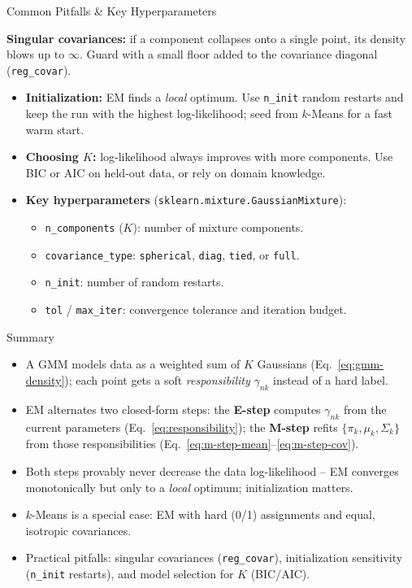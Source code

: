 \begin{frame}{Common Pitfalls \& Key Hyperparameters}
\begin{rlpitfall}
  \textbf{Singular covariances:} if a component collapses onto a single point, its density blows up to $\infty$.  Guard with a small floor added to the covariance diagonal (\texttt{reg\_covar}).
\end{rlpitfall}
\pause
\begin{itemize}
  \item \textbf{Initialization:} EM finds a \emph{local} optimum.  Use \texttt{n\_init} random restarts and keep the run with the highest log-likelihood; seed from $k$-Means for a fast warm start.
  \pause
  \item \textbf{Choosing $K$:} log-likelihood always improves with more components.  Use BIC or AIC on held-out data, or rely on domain knowledge.
  \pause
  \item \textbf{Key hyperparameters} (\texttt{sklearn.mixture.GaussianMixture}):
  \begin{itemize}
    \item \texttt{n\_components} ($K$): number of mixture components.
    \item \texttt{covariance\_type}: \texttt{spherical}, \texttt{diag}, \texttt{tied}, or \texttt{full}.
    \item \texttt{n\_init}: number of random restarts.
    \item \texttt{tol} / \texttt{max\_iter}: convergence tolerance and iteration budget.
  \end{itemize}
\end{itemize}
\end{frame}

\begin{frame}{Summary}
\begin{itemize}
  \item A GMM models data as a weighted sum of $K$ Gaussians (Eq.~\eqref{eq:gmm-density}); each point gets a soft \emph{responsibility} $\gamma_{nk}$ instead of a hard label.
  \item EM alternates two closed-form steps: the \textbf{E-step} computes $\gamma_{nk}$ from the current parameters (Eq.~\eqref{eq:responsibility}); the \textbf{M-step} refits $\{\pi_k, \mu_k, \Sigma_k\}$ from those responsibilities (Eq.~\eqref{eq:m-step-mean}--\eqref{eq:m-step-cov}).
  \item Both steps provably never decrease the data log-likelihood -- EM converges monotonically but only to a \emph{local} optimum; initialization matters.
  \item $k$-Means is a special case: EM with hard (0/1) assignments and equal, isotropic covariances.
  \item Practical pitfalls: singular covariances (\texttt{reg\_covar}), initialization sensitivity (\texttt{n\_init} restarts), and model selection for $K$ (BIC/AIC).
\end{itemize}
\end{frame}
